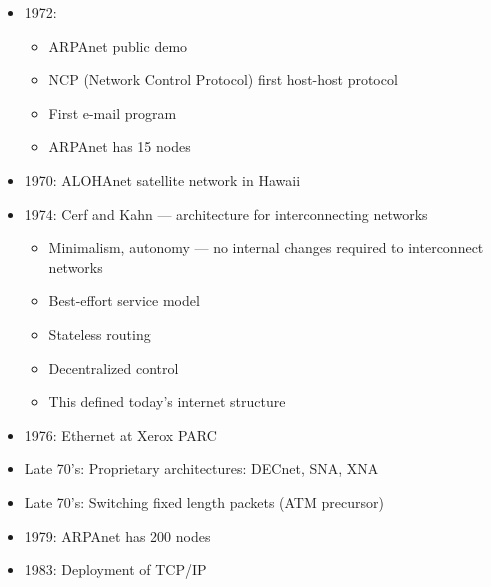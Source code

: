\begin{itemize}
\begin{itemize}
      \item 1972:

        \begin{itemize}

          \item ARPAnet public demo

          \item NCP (Network Control Protocol) first host-host protocol

          \item First e-mail program

          \item ARPAnet has 15 nodes

        \end{itemize}

      \item 1970: ALOHAnet satellite network in Hawaii

      \item 1974: Cerf and Kahn — architecture for interconnecting networks

        \begin{itemize}

          \item Minimalism, autonomy — no internal changes required to interconnect networks

          \item Best-effort service model

          \item Stateless routing

          \item Decentralized control

          \item This defined today's internet structure

        \end{itemize}

      \item 1976: Ethernet at Xerox PARC

      \item Late 70's: Proprietary architectures: DECnet, SNA, XNA

      \item Late 70's: Switching fixed length packets (ATM precursor)

      \item 1979: ARPAnet has 200 nodes

      \item 1983: Deployment of TCP/IP


\end{itemize}
\end{itemize}
